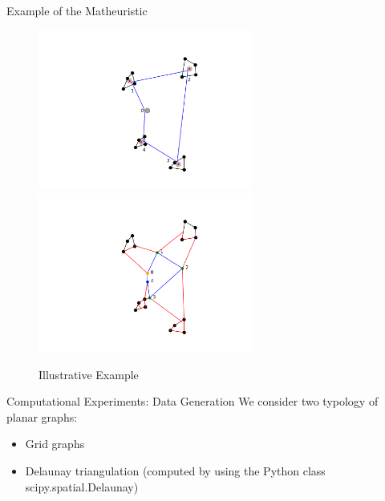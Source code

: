 \documentclass[slidestop,usepdftitle=false,10pt]{beamer}
\begin{document}
    \begin{frame}{Example of the Matheuristic}	
		\begin{figure}%
    		\hspace{-2.5cm}
        \includegraphics[width=7cm]{step0}\hspace{-1.5cm}\includegraphics[width=7cm]{step1}%
        \caption{Illustrative Example}%
        \label{fig:example}%
    	\end{figure}
    \end{frame}
    
    \begin{frame}{Computational Experiments: Data Generation}
        We consider two typology of planar graphs:
        \begin{itemize}
            \item Grid graphs
            \item Delaunay triangulation (computed by using the Python class scipy.spatial.Delaunay)
        \end{itemize}
    \end{frame}
    
\end{document}
